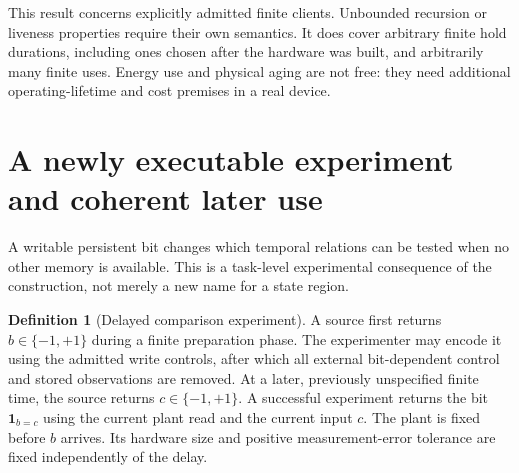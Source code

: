 \documentclass[11pt]{article}
\theoremstyle{definition}
\newtheorem{definition}[theorem]{Definition}
\theoremstyle{remark}
\begin{document}
This result concerns explicitly admitted finite clients. Unbounded recursion or liveness properties require their own semantics. It does cover arbitrary finite hold durations, including ones chosen after the hardware was built, and arbitrarily many finite uses. Energy use and physical aging are not free: they need additional operating-lifetime and cost premises in a real device.



\section{A newly executable experiment and coherent later use}\label{sec:experiments}
A writable persistent bit changes which temporal relations can be tested
when no other memory is available. This is a task-level experimental
consequence of the construction, not merely a new name for a state region.

\begin{definition}[Delayed comparison experiment]
A source first returns $b\in\{-1,+1\}$ during a finite preparation phase.
The experimenter may encode it using the admitted write controls, after
which all external bit-dependent control and stored observations are
removed. At a later, previously unspecified finite time, the source
returns $c\in\{-1,+1\}$. A successful experiment returns the bit
$\mathbf1_{b=c}$ using the current plant read and the current input $c$.
The plant is fixed before $b$ arrives. Its hardware size and positive
measurement-error tolerance are fixed independently of the delay.
\end{definition}
\end{document}
